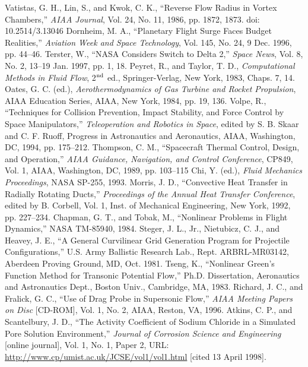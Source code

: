 \documentclass[journal]{aiaa-pretty}
\begin{document}
\begin{thebibliography}{}
 Vatistas, G. H., Lin, S., and Kwok, C. K., ``Reverse Flow Radius in Vortex Chambers,'' \textit{AIAA Journal}, Vol. 24, No. 11, 1986, pp. 1872, 1873. doi: 10.2514/3.13046
 Dornheim, M. A., ``Planetary Flight Surge Faces Budget Realities,'' \textit{Aviation Week and Space Technology}, Vol. 145, No. 24, 9 Dec. 1996, pp. 44--46.
 Terster, W., ``NASA Considers Switch to Delta 2,'' \textit{Space News}, Vol. 8, No. 2, 13--19 Jan. 1997, pp. 1, 18.
 Peyret, R., and Taylor, T. D., \textit{Computational Methods in Fluid Flow}, 2$^{{\rm nd}}$ ed., Springer-Verlag, New York, 1983, Chaps. 7, 14.
 Oates, G. C. (ed.), \textit{Aerothermodynamics of Gas Turbine and Rocket Propulsion}, AIAA Education Series, AIAA, New York, 1984, pp. 19, 136.
 Volpe, R., ``Techniques for Collision Prevention, Impact Stability, and Force Control by Space Manipulators,'' \textit{Teleoperation and Robotics in Space}, edited by S. B. Skaar and C. F. Ruoff, Progress in Astronautics and Aeronautics, AIAA, Washington, DC, 1994, pp. 175--212.
 Thompson, C. M., ``Spacecraft Thermal Control, Design, and Operation,'' \textit{AIAA Guidance, Navigation, and Control Conference}, CP849, Vol. 1, AIAA, Washington, DC, 1989, pp. 103--115
 Chi, Y. (ed.), \textit{Fluid Mechanics Proceedings}, NASA SP-255, 1993.
 Morris, J. D., ``Convective Heat Transfer in Radially Rotating Ducts,'' \textit{Proceedings of the Annual Heat Transfer Conference}, edited by B. Corbell, Vol. 1, Inst. of Mechanical Engineering, New York, 1992, pp. 227--234.
 Chapman, G. T., and Tobak, M., ``Nonlinear Problems in Flight Dynamics,'' NASA TM-85940, 1984.
 Steger, J. L., Jr., Nietubicz, C. J., and Heavey, J. E., ``A General Curvilinear Grid Generation Program for Projectile Configurations,'' U.S. Army Ballistic Research Lab., Rept. ARBRL-MR03142, Aberdeen Proving Ground, MD, Oct. 1981.
 Tseng, K., ``Nonlinear Green's Function Method for Transonic Potential Flow,'' Ph.D. Dissertation, Aeronautics and Astronautics Dept., Boston Univ., Cambridge, MA, 1983.
 Richard, J. C., and Fralick, G. C., ``Use of Drag Probe in Supersonic Flow,'' \textit{AIAA Meeting Papers on Disc} [CD-ROM], Vol. 1, No. 2, AIAA, Reston, VA, 1996.
 Atkins, C. P., and Scantelbury, J. D., ``The Activity Coefficient of Sodium Chloride in a Simulated Pore Solution Environment,'' \textit{Journal of Corrosion Science and Engineering} [online journal], Vol. 1, No. 1, Paper 2, URL: \url{http://www.cp/umist.ac.uk/JCSE/vol1/vol1.html} [cited 13 April 1998].

\end{thebibliography}
\end{document}
